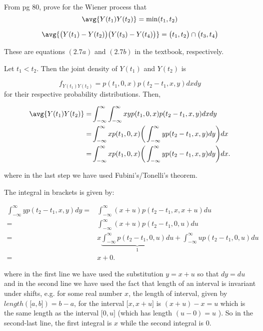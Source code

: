 

From pg 80, prove for the Wiener process that
\begin{equation*}
\avg{Y(t_1) Y(t_2)} = \min(t_1, t_2)
\end{equation*}

\begin{equation*}
\avg{ \big( Y(t_1) - Y(t_2) \big)  \big( Y(t_3) - Y(t_4) \big) } = \big( t_1, t_2 \big) \cap \big( t_3, t_4 \big)
\end{equation*}

These are equations $(2.7a)$ and $(2.7b)$ in the textbook, respectively.


Let $t_1 < t_2$. Then the joint density of $Y (t_1)$ and  $Y (t_2)$ is 

\begin{equation*}
f_{Y (t_1)Y(t_2)} = p(t_1, 0, x)p(t_2 - t_1, x, y)dxdy
\end{equation*}
for their respective probability distributions. Then, 

\begin{align*}
\avg{Y(t_1)Y(t_2)} =& \int_{-\infty}^{\infty} \int_{-\infty}^{\infty} x y p(t_1, 0, x)p(t_2 - t_1, x, y)dxdy \\
= & \int_{-\infty}^{\infty} x p(t_1, 0, x) \bigg( \int_{-\infty}^{\infty} y p(t_2 - t_1, x, y)dy \bigg) dx\\
= & \int_{-\infty}^{\infty} x p(t_1, 0, x) \bigg( \int_{-\infty}^{\infty} y p(t_2 - t_1, x, y)dy \bigg) dx .
\end{align*}

where in the last step we have used Fubini's/Tonelli's theorem. 

The integral in brackets is given by: 

\begin{align*}
\int_{-\infty}^{\infty} y p(t_2 - t_1, x, y)dy =& \int_{-\infty}^{\infty} (x + u) p(t_2 - t_1, x, x + u)du \\
= & \int_{-\infty}^{\infty} (x + u) p(t_2 - t_1, 0, u)du \\
= & x \underbrace{ \int_{-\infty}^{\infty} p(t_2 - t_1, 0, u)du }_1 + \int_{-\infty}^{\infty} u p(t_2 - t_1, 0, u)du \\
= & x + 0 .
\end{align*}

where in the first line we have used the substitution $y = x + u$ so that $dy = du$ and in the second line we have used the fact that length of an interval is invariant under shifts, e.g. for some real number $x$, the length of interval, given by $length(\big[a, b \big]) = b - a$, for the interval $ \big[x, x + u  \big] $ is $(x + u) - x = u$ which is the same length as the interval $ \big[0, u  \big] $ (which has length $(u - 0) = u$ ). So in the second-last line, the first integral is $x$ while the second integral is $0$.

